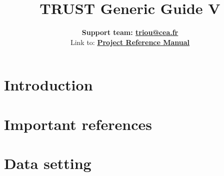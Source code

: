 \documentclass[a4paper,11pt,english]{report}
\def\TRUSTVERSION{}
\def\TRUSTVERSION{V\TRUSTV}
\def \REFERENCEMANUAL {TRUST_Reference_Manual.pdf}
\newcommand{\trustref}{Project\xspace}
\begin{document}
\title{\vspace{2cm}\Huge \bfseries{TRUST Generic Guide \TRUSTVERSION}}
\author{
\vspace{2cm} %
\LARGE \textbf{Support team: \href{mailto:triou@cea.fr}{triou@cea.fr}} \\
\vspace{1cm} %
Link to: \LARGE \textbf{\href{run:\REFERENCEMANUAL}{\trustref Reference Manual}}\\
}

\maketitle
\tableofcontents{}
\newpage


%
\chapter{Introduction}
%




%
\chapter{Important references}
%




%
\chapter{Data setting}
%

\end{document}
